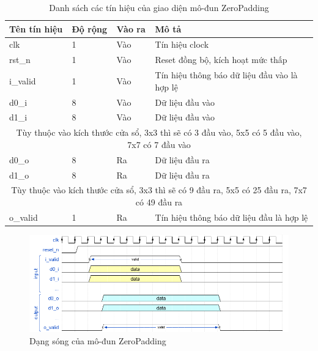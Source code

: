 \begin{table}[h]
    \centering
    \renewcommand{\arraystretch}{1.3} %
        \caption{Danh sách các tín hiệu của giao diện mô-đun ZeroPadding}
    \begin{tabular}{|p{3cm} p{2cm} p{2cm} p{8cm}|}
        \hline
        \rowcolor{gray!30}
        \textbf{Tên tín hiệu} & \textbf{Độ rộng} & \textbf{Vào ra} & \textbf{Mô tả} \\
        \hline
        clk & 1 & Vào & Tín hiệu clock \\
        \hline
        rst\_n & 1 & Vào & Reset đồng bộ, kích hoạt mức thấp \\
        \hline
        i\_valid & 1 & Vào & Tín hiệu thông báo dữ liệu đầu vào là hợp lệ
        \\ \hline
        d0\_i & 8 & Vào & Dữ liệu đầu vào
        \\ \hline
        d1\_i & 8 & Vào & Dữ liệu đầu vào
        \\
        \hline
        \multicolumn{4}{|c|}{Tùy thuộc vào kích thước cửa sổ, 3x3 thì sẽ có 3 đầu vào, 5x5 có 5 đầu vào, 7x7 có 7 đầu vào}
        \\ \hline
        d0\_o & 8 & Ra & Dữ liệu đầu ra
        \\ \hline
        d1\_o & 8 & Ra & Dữ liệu đầu ra
        \\ \hline
                \multicolumn{4}{|c|}{Tùy thuộc vào kích thước cửa sổ, 3x3 thì sẽ có 9 đầu ra, 5x5 có 25 đầu ra, 7x7 có 49 đầu ra}
        \\ \hline
        o\_valid & 1& Ra & Tín hiệu thông báo dữ liệu đầu là hợp lệ
        \\ \hline
    \end{tabular}

    \label{tab:signalListZeroPadding}
\end{table}

\begin{figure}[!ht]
    \centering
    \includegraphics[width=\linewidth]{figures/zeroPadding.png}
    \caption{Dạng sóng của mô-đun ZeroPadding}
    \label{fig:zeroPadding}
\end{figure}


